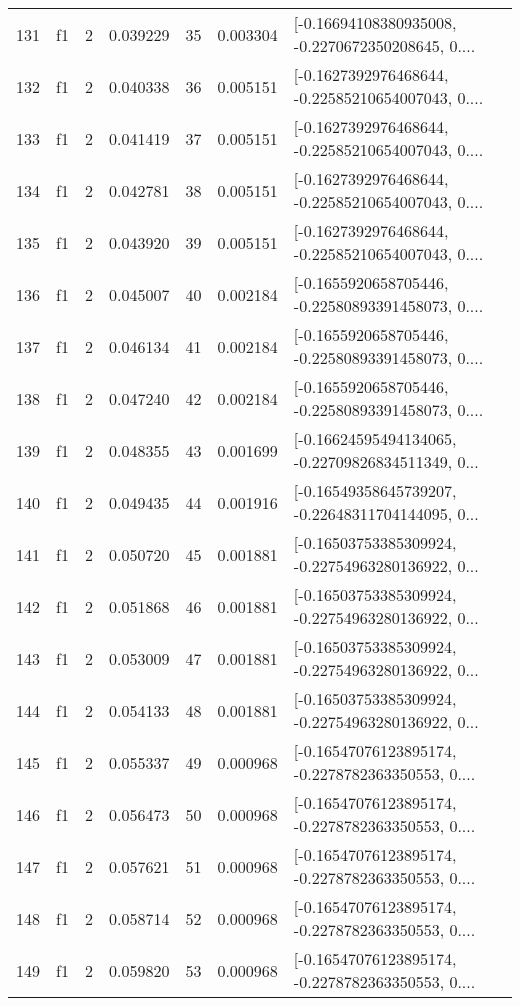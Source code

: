 \begin{tabular}{lllrlrl}
131 &  f1 &   2 &  0.039229 &   35 &  0.003304 &  [-0.16694108380935008, -0.2270672350208645, 0.... \\
132 &  f1 &   2 &  0.040338 &   36 &  0.005151 &  [-0.1627392976468644, -0.22585210654007043, 0.... \\
133 &  f1 &   2 &  0.041419 &   37 &  0.005151 &  [-0.1627392976468644, -0.22585210654007043, 0.... \\
134 &  f1 &   2 &  0.042781 &   38 &  0.005151 &  [-0.1627392976468644, -0.22585210654007043, 0.... \\
135 &  f1 &   2 &  0.043920 &   39 &  0.005151 &  [-0.1627392976468644, -0.22585210654007043, 0.... \\
136 &  f1 &   2 &  0.045007 &   40 &  0.002184 &  [-0.1655920658705446, -0.22580893391458073, 0.... \\
137 &  f1 &   2 &  0.046134 &   41 &  0.002184 &  [-0.1655920658705446, -0.22580893391458073, 0.... \\
138 &  f1 &   2 &  0.047240 &   42 &  0.002184 &  [-0.1655920658705446, -0.22580893391458073, 0.... \\
139 &  f1 &   2 &  0.048355 &   43 &  0.001699 &  [-0.16624595494134065, -0.22709826834511349, 0... \\
140 &  f1 &   2 &  0.049435 &   44 &  0.001916 &  [-0.16549358645739207, -0.22648311704144095, 0... \\
141 &  f1 &   2 &  0.050720 &   45 &  0.001881 &  [-0.16503753385309924, -0.22754963280136922, 0... \\
142 &  f1 &   2 &  0.051868 &   46 &  0.001881 &  [-0.16503753385309924, -0.22754963280136922, 0... \\
143 &  f1 &   2 &  0.053009 &   47 &  0.001881 &  [-0.16503753385309924, -0.22754963280136922, 0... \\
144 &  f1 &   2 &  0.054133 &   48 &  0.001881 &  [-0.16503753385309924, -0.22754963280136922, 0... \\
145 &  f1 &   2 &  0.055337 &   49 &  0.000968 &  [-0.16547076123895174, -0.2278782363350553, 0.... \\
146 &  f1 &   2 &  0.056473 &   50 &  0.000968 &  [-0.16547076123895174, -0.2278782363350553, 0.... \\
147 &  f1 &   2 &  0.057621 &   51 &  0.000968 &  [-0.16547076123895174, -0.2278782363350553, 0.... \\
148 &  f1 &   2 &  0.058714 &   52 &  0.000968 &  [-0.16547076123895174, -0.2278782363350553, 0.... \\
149 &  f1 &   2 &  0.059820 &   53 &  0.000968 &  [-0.16547076123895174, -0.2278782363350553, 0.... \\

\end{tabular}
